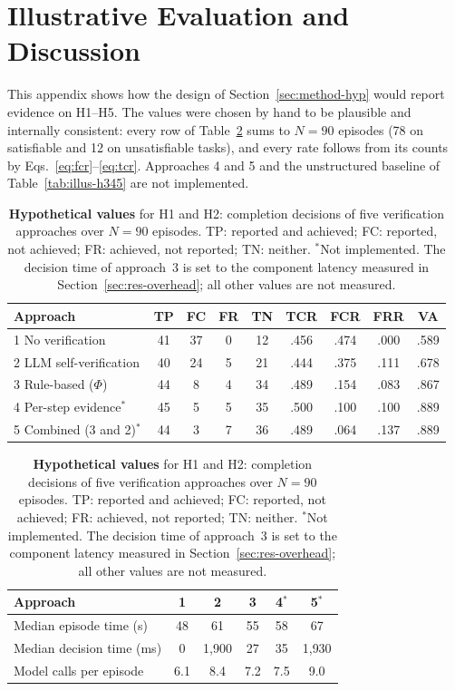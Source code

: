 \section{Illustrative Evaluation and Discussion}
\label{app:illustrative}

\noindent{}

\medskip
This appendix shows how the design of Section~\ref{sec:method-hyp} would report evidence on H1--H5. The values were chosen by hand to be plausible and internally consistent: every row of Table~\ref{tab:illus-verif} sums to $N=90$ episodes (78 on satisfiable and 12 on unsatisfiable tasks), and every rate follows from its counts by Eqs.~\eqref{eq:fcr}--\eqref{eq:tcr}. Approaches 4 and 5 and the unstructured baseline of Table~\ref{tab:illus-h345} are not implemented.

\begin{table}[h]
\centering
\caption{\textbf{Hypothetical values} for H1 and H2: completion decisions of five verification approaches over $N=90$ episodes. TP: reported and achieved; FC: reported, not achieved; FR: achieved, not reported; TN: neither. $^{*}$Not implemented. The decision time of approach~3 is set to the component latency measured in Section~\ref{sec:res-overhead}; all other values are not measured.}
\label{tab:illus-verif}
\footnotesize
\setlength{\tabcolsep}{2.1pt}
\begin{tabular}{@{}lcccccccc@{}}
\toprule
Approach & TP & FC & FR & TN & TCR & FCR & FRR & VA \\
\midrule
1 No verification & 41 & 37 & 0 & 12 & .456 & .474 & .000 & .589 \\
2 LLM self-verification & 40 & 24 & 5 & 21 & .444 & .375 & .111 & .678 \\
3 Rule-based ($\Phi$) & 44 & 8 & 4 & 34 & .489 & .154 & .083 & .867 \\
4 Per-step evidence$^{*}$ & 45 & 5 & 5 & 35 & .500 & .100 & .100 & .889 \\
5 Combined (3 and 2)$^{*}$ & 44 & 3 & 7 & 36 & .489 & .064 & .137 & .889 \\
\bottomrule
\end{tabular}

\vspace{3pt}
\setlength{\tabcolsep}{4pt}
\begin{tabular}{@{}lccccc@{}}
\toprule
Approach & 1 & 2 & 3 & 4$^{*}$ & 5$^{*}$ \\
\midrule
Median episode time (s) & 48 & 61 & 55 & 58 & 67 \\
Median decision time (ms) & 0 & 1{,}900 & 27 & 35 & 1{,}930 \\
Model calls per episode & 6.1 & 8.4 & 7.2 & 7.5 & 9.0 \\
\bottomrule
\end{tabular}
\end{table}

